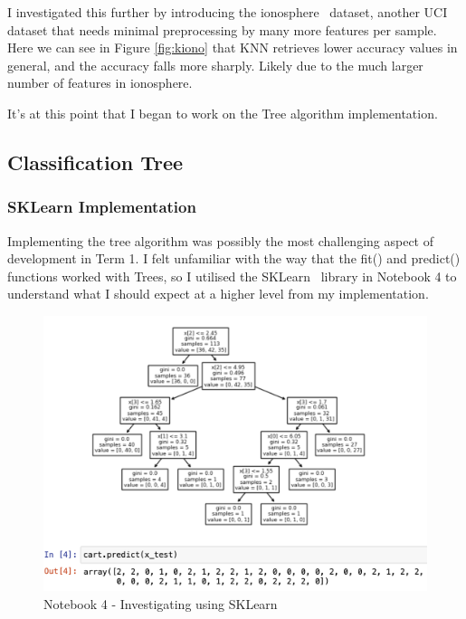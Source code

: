 \documentclass[letterpaper,10pt]{article}
\begin{document}
I investigated this further by introducing the ionosphere~\cite{ionosphere} dataset, another UCI dataset that needs minimal preprocessing by many more features per sample. Here we can see in Figure \ref{fig:kiono} that KNN retrieves lower accuracy values in general, and the accuracy falls more sharply. Likely due to the much larger number of features in ionosphere. \par
It's at this point that I began to work on the Tree algorithm implementation.
\subsection{Classification Tree}
\subsubsection{SKLearn Implementation}
Implementing the tree algorithm was possibly the most challenging aspect of development in Term 1. I felt unfamiliar with the way that the fit() and predict() functions worked with Trees, so I utilised the SKLearn~\cite{scikit-learn} library in Notebook 4 to understand what I should expect at a higher level from my implementation. \par

\begin{figure}[ht]
    \centering
    \includegraphics[width=1\textwidth]{carttree.png}
    \caption{Notebook 4 - Investigating using SKLearn}
    \label{fig:carttree}
\end{figure}
\end{document}
